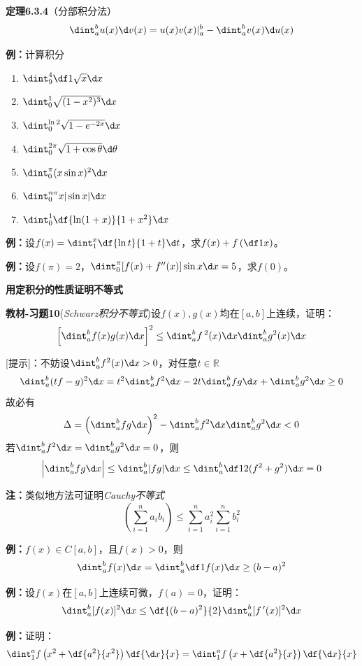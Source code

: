 {\bf 定理6.3.4}（分部积分法）
$${\dint_a^bu(x)\d v(x)=u(x)v(x)|_a^b-\dint_a^bv(x)\d u(x)}$$

{\bf 例：}计算积分
\begin{enumerate}[(1)]
  \setlength{\itemindent}{1cm}
  \item  $\dint_9^4\df 1{\sqrt x}\d x$ 
  \item $\dint_0^1\sqrt{(1-x^2)^3}\d x$ 
  \item $\dint_0^{\ln 2}\sqrt{1-e^{-2x}}\d x$
  \item $\dint_0^{2\pi}\sqrt{1+\cos\theta}\d\theta$ 
  \item $\dint_0^{\pi}(x\sin x)^2\d x$ 
  \item $\dint_0^{n\pi}x|\sin x|\d x$ 
  \item $\dint_0^1\df{\ln(1+x)}{1+x^2}\d x$
\end{enumerate}

{\bf 例：}设$f(x)=\dint_1^x\df{\ln t}{1+t}\d t$，求$f(x)+f
\left(\df1x\right)$。

{\bf 例：}设$f(\pi)=2$，$\dint_0^{\pi}[f(x)+f''(x)]\sin x\d x=5$，求$f(0)$。

\begin{shaded}
	{\bf 用定积分的性质证明不等式}
	
	{\bf 教材-习题10}({\it Schwarz积分不等式})设$f(x),g(x)$均在$[a,b]$上连续，证明：
	$$\left[\dint_a^bf(x)g(x)\d x\right]^2
	\leq\dint_a^bf\,^2(x)\d x\dint_a^bg^2(x)\d x$$
	
	[提示]：不妨设$\dint_a^bf^2(x)\d x>0$，对任意$t\in\mathbb{R}$
	$$\dint_a^b(tf-g)^2\d x=t^2\dint_a^bf^2\d x-2t\dint_a^bfg\d x
	+\dint_a^bg^2\d x\geq 0$$
	故必有
	$$\Delta=\left(\dint_a^bfg\d x\right)^2-\dint_a^bf^2\d x\dint_a^b
	g^2\d x<0$$
	若$\dint_a^bf^2\d x=\dint_a^b g^2\d x=0$，则
	$$\left|\dint_a^bfg\d x\right|\leq\dint_a^b|fg|\d x
	\leq\dint_a^b\df12(f^2+g^2)\d x=0$$
	
	{\bf 注：}类似地方法可证明{\it Cauchy不等式}
	$$\left(\sum\limits_{i=1}^na_ib_i\right)\leq
	\sum\limits_{i=1}^na_i^2\sum\limits_{i=1}^nb_i^2$$
	
	{\bf 例：}$f(x)\in C[a,b]$，且$f(x)>0$，则
	$$\dint_a^bf(x)\d x=\dint_a^b\df1{f(x)}\d x\geq(b-a)^2$$
	
	{\bf 例：}设$f(x)$在$[a,b]$上连续可微，$f(a)=0$，证明：
	$$\dint_a^b[f(x)]^2\d x\leq\df{(b-a)^2}{2}\dint_a^b[f\,'(x)]^2\d x$$
\end{shaded}

{\bf 例：}证明：
$$\dint_1^af\left(x^2+\df{a^2}{x^2}\right)\df{\d x}{x}
=\dint_1^af\left(x+\df{a^2}{x}\right)\df{\d x}{x}$$

